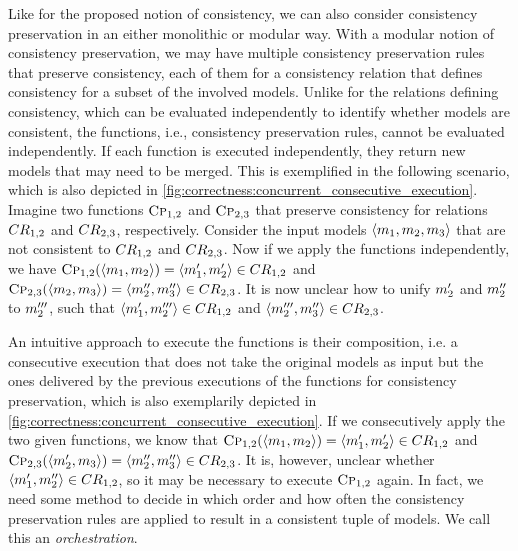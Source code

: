 Like for the proposed notion of consistency, we can also consider consistency preservation in an either monolithic or modular way.
With a modular notion of consistency preservation, we may have multiple consistency preservation rules that preserve consistency, each of them for a consistency relation that defines consistency for a subset of the involved models.
Unlike for the relations defining consistency, which can be evaluated independently to identify whether models are consistent, the functions, i.e., consistency preservation rules, cannot be evaluated independently.
If each function is executed independently, they return new models that may need to be merged. 
This is exemplified in the following scenario, which is also depicted in \autoref{fig:correctness:concurrent_consecutive_execution}.
Imagine two functions $\textsc{Cp}_{1,2}$ and $\textsc{Cp}_{2,3}$ that preserve consistency for relations $\consistencyrelation{CR}{1,2}$ and $\consistencyrelation{CR}{2,3}$, respectively.
Consider the input models $\tupled{\model{m}{1}, \model{m}{2}, \model{m}{3}}$ that are not consistent to $\consistencyrelation{CR}{1,2}$ and $\consistencyrelation{CR}{2,3}$.
Now if we apply the functions independently, we have $\function{Cp}_{1,2}(\tupled{\model{m}{1}, \model{m}{2}}) = \tupled{\model{m}{1}', \model{m}{2}'} \in \consistencyrelation{CR}{1,2}$ and 
$\function{Cp}_{2,3}(\tupled{\model{m}{2}, \model{m}{3}}) = \tupled{\model{m}{2}'', \model{m}{3}''} \in \consistencyrelation{CR}{2,3}$.
It is now unclear how to unify $\model{m}{2}'$ and $\model{m}{2}''$ to $\model{m}{2}'''$, such that $\tupled{\model{m}{1}', \model{m}{2}'''} \in \consistencyrelation{CR}{1,2}$ and  $\tupled{\model{m}{2}''', \model{m}{3}''} \in \consistencyrelation{CR}{2,3}$.

An intuitive approach to execute the functions is their composition, i.e. a consecutive execution that does not take the original models as input but the ones delivered by the previous executions of the functions for consistency preservation, which is also exemplarily depicted in \autoref{fig:correctness:concurrent_consecutive_execution}.
If we consecutively apply the two given functions, we know that $\function{Cp}_{1,2}(\tupled{\model{m}{1}, \model{m}{2}}) = \tupled{\model{m}{1}', \model{m}{2}'} \in \consistencyrelation{CR}{1,2}$ and 
$\function{Cp}_{2,3}(\tupled{\model{m}{2}', \model{m}{3}}) = \tupled{\model{m}{2}'', \model{m}{3}''} \in \consistencyrelation{CR}{2,3}$.
It is, however, unclear whether $\tupled{\model{m}{1}', \model{m}{2}''} \in \consistencyrelation{CR}{1,2}$, so it may be necessary to execute $\textsc{Cp}_{1,2}$ again.
In fact, we need some method to decide in which order and how often the consistency preservation rules are applied to result in a consistent tuple of models.
We call this an \emph{orchestration}.

